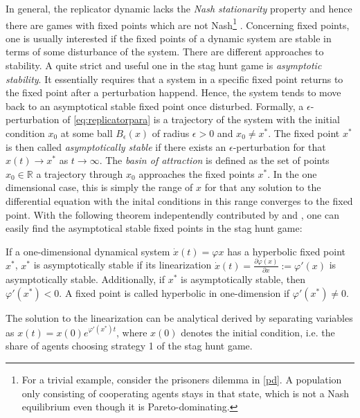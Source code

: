 \documentclass[11pt]{article}
\newcommand{\realnumb}{\mathbb{R}}
\begin{document}
In general, the replicator dynamic lacks the \textit{Nash stationarity} 
property and hence there are games with fixed points which are not
Nash\footnote{For a trivial example, consider the prisoners dilemma in 
\ref{pd}. A population only consisting of cooperating agents stays in
that state, which is not a Nash equilibrium even though it is 
Pareto-dominating.} \parencite{sandholm_population_2010}.
Concerning fixed points, one is usually interested if the fixed points of 
a dynamic system are stable in terms of some disturbance of the system. 
There are different approaches to stability. A quite strict and useful one 
in the stag hunt game is \textit{asymptotic stability}. 
It essentially requires that a system in a specific fixed point returns 
to the fixed point after a perturbation happend.
Hence, the system tends to move back to an asymptotical stable fixed point
once disturbed. Formally, a $\epsilon$-perturbation of 
\eqref{eq:replicatorpara} is a trajectory of the system with the initial
condition $x_0$ at some ball $B_\epsilon(x)$ of radius $\epsilon >0$ and 
$x_0 \neq x^*$. The fixed point $x^*$ is then called \textit{asymptotically
stable} if there exists an $\epsilon$-perturbation for that $x(t) \rightarrow
x^*$ as $t \rightarrow \infty$. 
The \textit{basin of attraction} is defined as the set of points 
$x_0 \in \realnumb$ a trajectory through $x_0$ approaches the fixed points 
$x^*$. In the one dimensional case, this is simply the range of $x$ for that
any solution to the differential equation with the inital conditions in this
range converges to the fixed point. With the following theorem indepentendly
contributed by \cite{hartmann_lemma_1960} and 
\cite{grobman_homeomorphism_1959}, one can easily 
find the asymptotical stable fixed points in the stag hunt game:
\begin{mydef}
        If a one-dimensional dynamical system $\dot{x}(t) = \varphi{x}$ 
        has a hyperbolic fixed point $x^*$, $x^*$ is asymptotically stable
        if its linearization 
        $\dot{x}(t) = \frac{\partial\varphi(x)}{\partial x} := \varphi'(x)$ 
        is asymptotically stable. Additionally, if $x^*$ is 
        asymptotically stable, then $\varphi'(x^*)<0$. A fixed point
        is called hyperbolic in one-dimension if $\varphi'(x^*) \neq 0$.
\end{mydef}
The solution to the linearization can be analytical derived by separating 
variables as $x(t)= x(0) e^{\varphi'(x^*)t}$, where $x(0)$ denotes the 
initial condition, i.e. the share of agents choosing strategy 1 of the 
stag hunt game.
\end{document}
